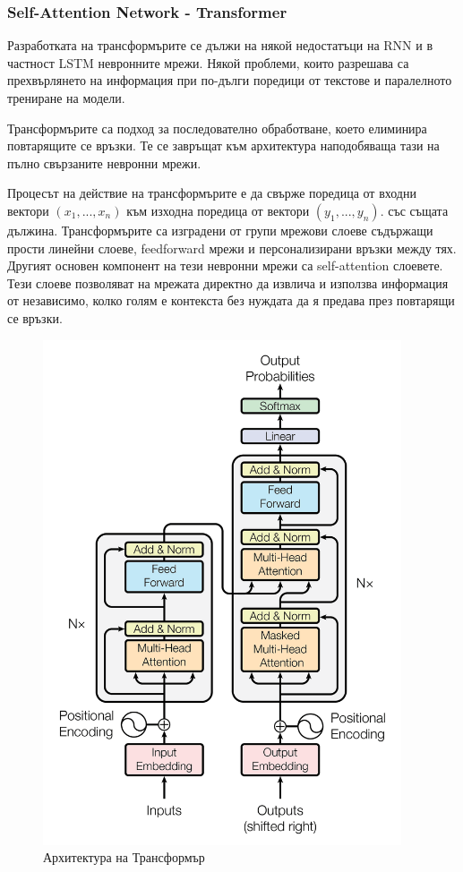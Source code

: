\documentclass{article}
\begin{document}
    \subsubsection{Self-Attention Network - Transformer}

    Разработката на трансформърите се дължи на някой недостатъци на RNN и в частност LSTM невронните мрежи. Някой проблеми,
    които разрешава са прехвърлянето на информация при по-дълги поредици от текстове и паралелното трениране на модели.

    Трансформърите са подход за последователно обработване, което елиминира повтарящите се връзки. Те се завръщат към
    архитектура наподобяваща тази на пълно свързаните невронни мрежи.

    Процесът на действие на трансформърите е да свърже поредица от входни вектори $(x_1, ..., x_n)$ към изходна поредица от
    вектори $(y_1, ..., y_n)$. със същата дължина. Трансформърите са изградени от групи мрежови слоеве съдържащи прости
    линейни слоеве, feedforward мрежи и персонализирани връзки между тях. Другият основен компонент на тези невронни мрежи
    са self-attention слоевете. Тези слоеве позволяват на мрежата директно да извлича и използва информация от независимо,
    колко голям е контекста без нуждата да я предава през повтарящи се връзки.

    \begin{figure}[H]
        \centering
        \captionsetup{justification=centering}
        \includegraphics[width=400px, keepaspectratio]{chapter-03/transformer.png}
        \caption{Архитектура на Трансформър}
    \end{figure}
\end{document}
